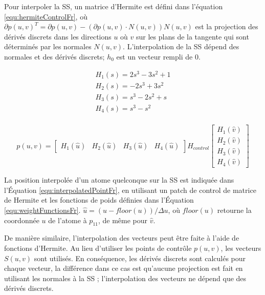 Pour interpoler la SS, un matrice d'Hermite est défini dans l'équation \ref{equ:hermiteControlFr},
où $\partial p(u,v)^T = \partial p(u,v) - (\partial p(u,v) \cdot N(u, v))N(u,v)$ est la projection 
des dérivés discrets dans les directions $u$ où $v$ sur les plans de la tangente
qui sont déterminés par les normales $N(u,v)$. 
L'interpolation de la SS dépend des normales et des dérivés discrets; $h_{0}$ est un vecteur rempli de $0$.

\begin{equation}
 \begin{array}{l}
  H_1(s)= 2s^3 - 3s^2 + 1\\
  H_2(s)= -2s^3 + 3s^2\\
  H_3(s)= s^3 - 2s^2 + s\\
  H_4(s)= s^3 - s^2\\
 \end{array}
\label{equ:weightFunctionsFr}
\end{equation}

\begin{equation}
 p(u, v) = \left [ \begin{array}{cccc} H_1(\hat u) & H_2(\hat u) & H_3(\hat u) & H_4(\hat u) \end{array} \right ]
                H_{control}
           \left [ \begin{array}{c} H_1(\hat v) \\
				     H_2(\hat v) \\ 
				     H_3(\hat v) \\ 
				     H_4(\hat v) 
		    \end{array} \right ]
\label{equ:interpolatedPointFr}
\end{equation}

La position interpolée d'un atome quelconque sur la SS est indiquée dans l'Équation \ref{equ:interpolatedPointFr},
en utilisant un patch de control de matrice de Hermite et les fonctions de poids définies dans l'Équation \ref{equ:weightFunctionsFr}.
$\hat u = (u - floor(u)) / \Delta u$, où $floor(u)$ retourne la coordonnée $u$ de l'atome à $p_{11}$,
de même pour $\hat v$.

De manière similaire, l'interpolation des vecteurs peut être faite à l'aide de fonctions d'Hermite. Au lieu d'utiliser les points de contrôle
$p (u, v)$, les vecteurs $S (u, v)$ sont utilisés. En conséquence, les dérivés discrets sont calculés pour chaque vecteur, la différence
dans ce cas est qu'aucune projection est fait en utilisant les normales à la SS ; l'interpolation des vecteurs ne dépend que des dérivés discrets.

